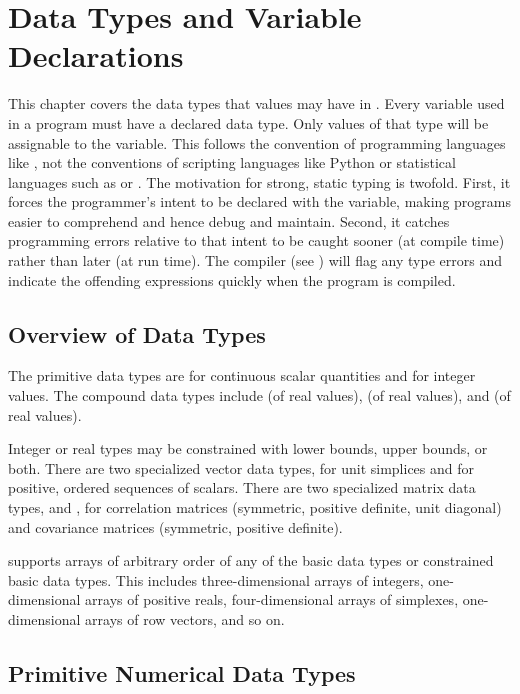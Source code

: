 \chapter{Data Types and Variable Declarations}\label{data-types.chapter}

This chapter covers the data types that values may have in \Stan.
Every variable used in a \Stan program must have a declared data type.
Only values of that type will be assignable to the variable.  This
follows the convention of programming languages like \Cpp, not the
conventions of scripting languages like Python or statistical
languages such as \R or \BUGS.  The motivation for strong, static
typing is twofold.  First, it forces the programmer's intent to be
declared with the variable, making programs easier to comprehend and
hence debug and maintain.  Second, it catches programming errors
relative to that intent to be caught sooner (at compile time) rather
than later (at run time).  The \Stan compiler (see )
will flag any type errors and indicate the offending expressions
quickly when the program is compiled.

\section{Overview of Data Types}

The primitive \Stan data types are  for continuous scalar
quantities and  for integer values.  The compound data
types include  (of real values),  (of
real values), and  (of real values).

Integer or real types may be constrained with lower bounds, upper
bounds, or both.  There are two specialized vector data types,
 for unit simplices and  for positive,
ordered sequences of scalars.  There are two specialized matrix data
types,  and , for correlation
matrices (symmetric, positive definite, unit diagonal) and covariance
matrices (symmetric, positive definite). 

\Stan supports arrays of arbitrary order of any of the basic data
types or constrained basic data types.  This includes
three-dimensional arrays of integers, one-dimensional arrays of
positive reals, four-dimensional arrays of simplexes, one-dimensional
arrays of row vectors, and so on.



\section{Primitive Numerical Data Types}

